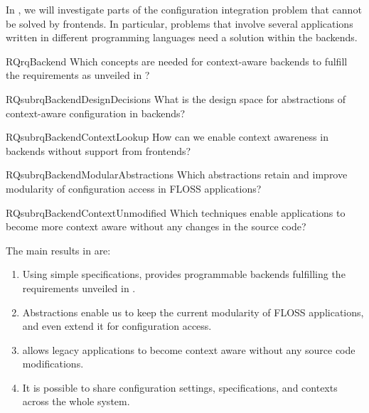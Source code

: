 In , we will investigate parts of the configuration integration problem that cannot be solved by frontends.
In particular, problems that involve several applications written in different programming languages need a solution within the backends.

\begin{restatable}{RQ}{rqBackend}
Which concepts are needed for context-aware backends to fulfill the requirements as unveiled in ?%
\label{rq:backend}
\end{restatable}

\begin{restatable}{RQsub}{rqBackendDesignDecisions}
What is the design space for abstractions of context-aware configuration in backends?%
\label{rq:backend-design-decisions}
\end{restatable}

\begin{restatable}{RQsub}{rqBackendContextLookup}
How can we enable context awareness in backends without support from frontends?%
\label{rq:backend-context-lookup}
\end{restatable}

\begin{restatable}{RQsub}{rqBackendModularAbstractions}
\label{rq:backend-modular-abstractions}
Which abstractions retain and improve modularity of configuration access in FLOSS applications?
\end{restatable}


\begin{restatable}{RQsub}{rqBackendContextUnmodified}
 \label{rq:backend-context-unmodified}
 Which techniques enable applications to become more context aware without any changes in the source code?
\end{restatable}

\begin{contribution}
The main results in  are:
\begin{enumerate}
\item Using simple specifications, \elektra{} provides programmable backends fulfilling the requirements unveiled in .
\item Abstractions enable us to keep the current modularity of FLOSS applications, and even extend it for configuration access.
\item \elektra{} allows legacy applications to become context aware without any source code modifications.
\item It is possible to share configuration settings, specifications, and contexts across the whole system.
\end{enumerate}
\end{contribution}

